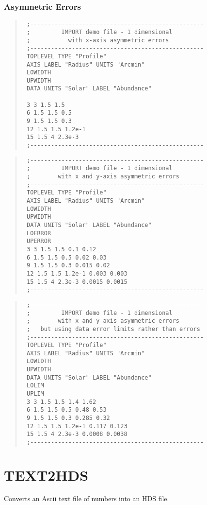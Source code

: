 \documentclass{book}
\renewcommand{\_}{{\tt\char'137}}     %
\begin{document}
\subsubsection{Asymmetric Errors}
\begin{quote}\begin{verbatim}
 ;--------------------------------------------------
 ;         IMPORT demo file - 1 dimensional
 ;           with x-axis asymmetric errors
 ;--------------------------------------------------
 TOPLEVEL TYPE "Profile"
 AXIS LABEL "Radius" UNITS "Arcmin"
 LOWIDTH
 UPWIDTH
 DATA UNITS "Solar" LABEL "Abundance"
 
 3 3 1.5 1.5
 6 1.5 1.5 0.5
 9 1.5 1.5 0.3
 12 1.5 1.5 1.2e-1
 15 1.5 4 2.3e-3
 ;--------------------------------------------------
\end{verbatim}\end{quote}
\begin{quote}\begin{verbatim}
 ;--------------------------------------------------
 ;         IMPORT demo file - 1 dimensional
 ;        with x and y-axis asymmetric errors
 ;--------------------------------------------------
 TOPLEVEL TYPE "Profile"
 AXIS LABEL "Radius" UNITS "Arcmin"
 LOWIDTH
 UPWIDTH
 DATA UNITS "Solar" LABEL "Abundance"
 LOERROR
 UPERROR
 3 3 1.5 1.5 0.1 0.12
 6 1.5 1.5 0.5 0.02 0.03
 9 1.5 1.5 0.3 0.015 0.02
 12 1.5 1.5 1.2e-1 0.003 0.003
 15 1.5 4 2.3e-3 0.0015 0.0015
 ;--------------------------------------------------
\end{verbatim}\end{quote}
\begin{quote}\begin{verbatim}
 ;--------------------------------------------------
 ;         IMPORT demo file - 1 dimensional
 ;        with x and y-axis asymmetric errors
 ;   but using data error limits rather than errors
 ;--------------------------------------------------
 TOPLEVEL TYPE "Profile"
 AXIS LABEL "Radius" UNITS "Arcmin"
 LOWIDTH
 UPWIDTH
 DATA UNITS "Solar" LABEL "Abundance"
 LOLIM
 UPLIM
 3 3 1.5 1.5 1.4 1.62
 6 1.5 1.5 0.5 0.48 0.53
 9 1.5 1.5 0.3 0.285 0.32
 12 1.5 1.5 1.2e-1 0.117 0.123
 15 1.5 4 2.3e-3 0.0008 0.0038
 ;--------------------------------------------------
\end{verbatim}\end{quote}
\section{TEXT2HDS}
Converts an Ascii text file of numbers into an HDS file.
 
\end{document}
